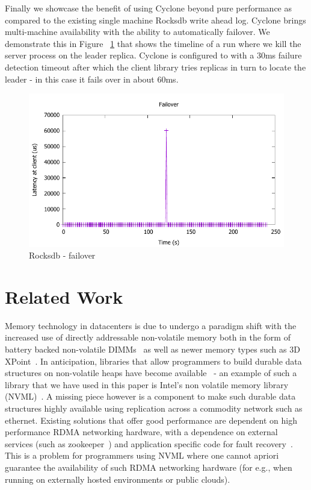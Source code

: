 \documentclass[10pt, preprint, nonatbib]{sigplanconf}
\begin{document}
Finally we showcase the benefit of using Cyclone beyond pure performance as
compared to the existing single machine Rocksdb write ahead log. Cyclone brings
multi-machine availability with the ability to automatically failover. We
demonstrate this in Figure ~\ref{fig:timeline} that shows the timeline of a run
where we kill the server process on the leader replica. Cyclone is configured to
with a 30ms failure detection timeout after which the client library tries
replicas in turn to locate the leader - in this case it fails over in about
60ms.

\begin{figure}
\includegraphics[scale=0.6]{results2/failover.pdf}
\caption{Rocksdb - failover}
\label{fig:timeline}
\end{figure}


\section{Related Work}
Memory technology in datacenters is due to undergo a paradigm shift with the
increased use of directly addressable non-volatile memory both in the form of
battery backed non-volatile DIMMs~\cite{farm} as well as newer memory types such
as 3D XPoint~\cite{pmfs, bpfs}. In anticipation, libraries that allow
programmers to build durable data structures on non-volatile heaps have become
available~\cite{mnemosyne, nvheaps, cdds} - an example of such a library that we
have used in this paper is Intel's non volatile memory library
(NVML)~\cite{nvml}. A missing piece however is a component to make such durable
data structures highly available using replication across a commodity network
such as ethernet. Existing solutions that offer good performance are dependent
on high performance RDMA networking hardware, with a dependence on external
services (such as zookeeper~\cite{zookeeper}) and application specific code for
fault recovery~\cite{farm, htm}.  This is a problem for programmers using NVML
where one cannot apriori guarantee the availability of such RDMA networking
hardware (for e.g., when running on externally hosted environments or public
clouds).
\end{document}
